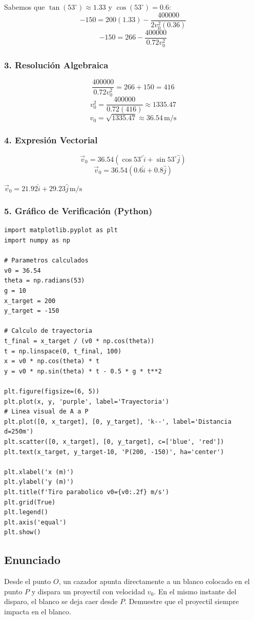 \documentclass[12pt, a4paper]{article}
\begin{document}
Sabemos que $\tan(53^\circ) \approx 1.33$ y $\cos(53^\circ) = 0.6$:
$$ -150 = 200(1.33) - \frac{400000}{2 v_0^2 (0.36)} $$
$$ -150 = 266 - \frac{400000}{0.72 v_0^2} $$

\subsubsection*{3. Resolución Algebraica}
$$ \frac{400000}{0.72 v_0^2} = 266 + 150 = 416 $$
$$ v_0^2 = \frac{400000}{0.72(416)} \approx 1335.47 $$
$$ v_0 = \sqrt{1335.47} \approx 36.54\,\text{m/s} $$

\subsubsection*{4. Expresión Vectorial}
$$ \vec{v}_0 = 36.54 (\cos 53^\circ \hat{i} + \sin 53^\circ \hat{j}) $$
$$ \vec{v}_0 = 36.54 (0.6 \hat{i} + 0.8 \hat{j}) $$
\begin{tcolorbox}[colback=blue!5!white, colframe=blue!75!black, title=Respuesta Final]
\centering
$\vec{v}_0 = 21.92\hat{i} + 29.23\hat{j} \,\text{m/s}$
\end{tcolorbox}

\subsubsection*{5. Gráfico de Verificación (Python)}
\begin{verbatim}
import matplotlib.pyplot as plt
import numpy as np

# Parametros calculados
v0 = 36.54
theta = np.radians(53)
g = 10
x_target = 200
y_target = -150

# Calculo de trayectoria
t_final = x_target / (v0 * np.cos(theta))
t = np.linspace(0, t_final, 100)
x = v0 * np.cos(theta) * t
y = v0 * np.sin(theta) * t - 0.5 * g * t**2

plt.figure(figsize=(6, 5))
plt.plot(x, y, 'purple', label='Trayectoria')
# Linea visual de A a P
plt.plot([0, x_target], [0, y_target], 'k--', label='Distancia d=250m')
plt.scatter([0, x_target], [0, y_target], c=['blue', 'red'])
plt.text(x_target, y_target-10, 'P(200, -150)', ha='center')

plt.xlabel('x (m)')
plt.ylabel('y (m)')
plt.title(f'Tiro parabolico v0={v0:.2f} m/s')
plt.grid(True)
plt.legend()
plt.axis('equal')
plt.show()
\end{verbatim}

\newpage

\subsection*{Enunciado}
Desde el punto $O$, un cazador apunta directamente a un blanco colocado en el punto $P$ y dispara un proyectil con velocidad $v_0$. En el mismo instante del disparo, el blanco se deja caer desde $P$. Demuestre que el proyectil siempre impacta en el blanco.
\end{document}
